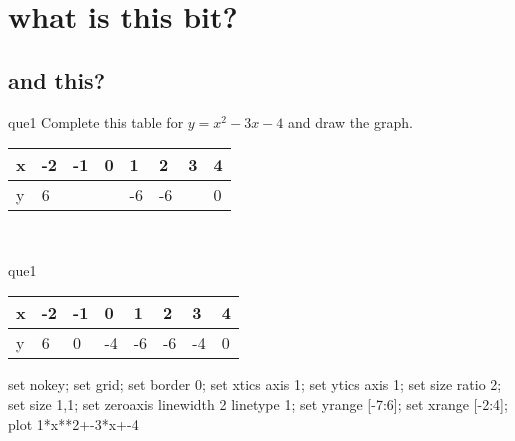 \documentclass[13.5pt, varwidth=true]{beamer}
\begin{document}
\date{}

\section[Graphs]{what is this bit?}
\subsection[title]{and this?}

\begin{frame}[shrink=19,fragile]
	\begin{beamercolorbox}[rounded=true, left, shadow=true,wd=14.8cm]{que1}
		 Complete this table for $y = x^{2} - 3x - 4$ and draw the graph. \\[0.3cm] \renewcommand{\arraystretch}{1.2}\begin{tabular}{|C|C|C|C|C|C|C|C|} \hline x & -2 & -1 & 0 & 1 & 2 & 3 & 4 \\ \hline y & 6 &  &  & -6 & -6 &  & 0\\ \hline \end{tabular}\\[0.3cm]
	\end{beamercolorbox}
\end{frame}
\begin{frame}[shrink=19,fragile]
	\begin{beamercolorbox}[rounded=true, left, shadow=true,wd=14.8cm]{que1}
		\renewcommand{\arraystretch}{1.2}\begin{tabular}{|C|C|C|C|C|C|C|C|} \hline x & -2 & -1 & 0 & 1 & 2 & 3 & 4 \\ \hline y & 6 & 0 & -4 & -6 & -6 & -4 & 0\\ \hline \end{tabular}\begin{gnuplot}[terminal=pdf] set nokey; set grid; set border 0; set xtics axis 1; set ytics axis 1; set size ratio 2; set size 1,1; set zeroaxis linewidth 2 linetype 1; set yrange [-7:6]; set xrange [-2:4]; plot 1*x**2+-3*x+-4 \end{gnuplot}
	\end{beamercolorbox}
\end{frame}
\end{document}
